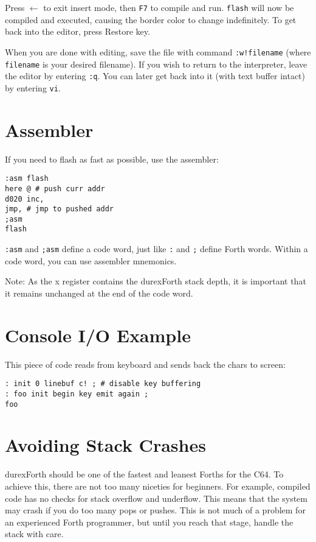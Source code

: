 Press $\leftarrow$ to exit insert mode, then \texttt{F7} to compile and run. \texttt{flash} will now
be compiled and executed, causing the border color to change indefinitely. To get back into the
editor, press Restore key.

When you are done with editing, save the file with command \texttt{:w!filename}
(where \texttt{filename} is your desired filename).
If you wish to return to the interpreter, leave the
editor by entering \texttt{:q}. You can later get back into it (with
text buffer intact) by entering \texttt{vi}.

\section{Assembler}

If you need to flash as fast as possible, use the assembler:

\begin{verbatim}
:asm flash
here @ # push curr addr
d020 inc,
jmp, # jmp to pushed addr
;asm
flash
\end{verbatim}

\texttt{:asm} and \texttt{;asm} define a code word, just like \texttt{:} and \texttt{;} define Forth words. Within a code word, you can use assembler mnemonics. 

Note: As the x register contains the durexForth stack depth, it is important that it remains unchanged at the end of the code word.

\section{Console I/O Example}

This piece of code reads from keyboard and sends back the chars to screen:

\begin{verbatim}
: init 0 linebuf c! ; # disable key buffering
: foo init begin key emit again ;
foo
\end{verbatim}

\section{Avoiding Stack Crashes}

durexForth should be one of the fastest and leanest Forths for the C64. To achieve this, there are
not too many niceties for beginners. For example, compiled code has no checks for stack overflow
and underflow. This means that the system may crash if you do too many pops or pushes. This is not
much of a problem for an experienced Forth programmer, but until you reach that stage, handle the
stack with care.

